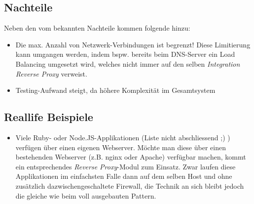 \subsection*{Nachteile}
Neben den vom  bekannten Nachteile kommen folgende hinzu:

\begin{itemize}
	\item Die max. Anzahl von Netzwerk-Verbindungen ist begrenzt! Diese Limitierung kann umgangen werden, indem bspw. bereits beim DNS-Server ein Load Balancing umgesetzt wird, welches nicht immer auf den selben \emph{Integration Reverse Proxy} verweist.
	\item Testing-Aufwand steigt, da höhere Komplexität im Gesamtsystem
\end{itemize}

\subsection*{Reallife Beispiele}
\begin{itemize}
	\item Viele Ruby- oder Node.JS-Applikationen (Liste nicht abschliessend ;) ) verfügen über einen eigenen Webserver. Möchte man diese über einen bestehenden Webserver (z.B. nginx oder Apache) verfügbar machen, kommt ein entsprechendes \emph{Reverse Proxy}-Modul zum Einsatz.
	Zwar laufen diese Applikationen im einfachsten Falle dann auf dem selben Host und ohne zusätzlich dazwischengeschaltete Firewall, die Technik an sich bleibt jedoch die gleiche wie beim voll ausgebauten Pattern.
\end{itemize}